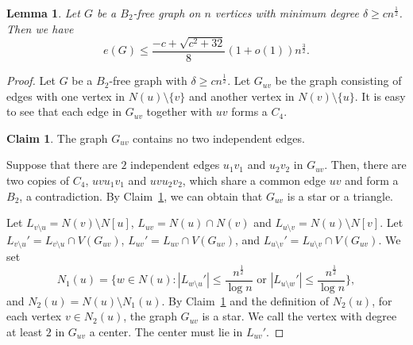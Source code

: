 \documentclass[11pt,a4paper]{article}
\newtheorem{lemma}{Lemma}[section]
\theoremstyle{definition}
\newtheorem{claimthm}{Claim}[section]
\newenvironment{claimproof}
  {\renewcommand{\qedsymbol}{\ensuremath{\blacksquare}}\proof}
  {\endproof}
  {\endproof}
\begin{document}
        \begin{lemma}\label{lem: with large min degree}
            Let $G$ be a $B_2$-free graph on $n$ vertices with minimum degree $\delta \geq c n^{\frac{1}{2}}$. Then we have
            \begin{equation*}
                e(G) \leq \frac{-c + \sqrt{c^2 + 32}}{8} (1 + o(1)) n^{\frac{3}{2}}. 
            \end{equation*}
        \end{lemma}
        \begin{proof}
            Let $G$ be a $B_2$-free graph with $\delta \geq c n^{\frac{1}{2}}$.
            Let $G_{uv}$ be the graph consisting of edges with one vertex in $N(u) \setminus \{v\}$ and another vertex in $N(v) \setminus \{u\}$.
            It is easy to see that each edge in $G_{uv}$ together with $uv$ forms a $C_4$.



            \begin{claimthm} \label{twoind}
             The graph $G_{uv}$ contains no two independent edges.
             \end{claimthm}
             
            \begin{claimproof}
                Suppose that there are $2$ independent edges $u_1 v_1$ and $u_2 v_2$ in $G_{uv}$.
                Then, there are two copies of $C_4$, $uv u_1 v_1$ and $uv u_2 v_2$, which share a common edge $uv$ and form a $B_2$, a contradiction.
            \end{claimproof}
            By Claim~\ref{twoind}, we can obtain that $G_{uv}$ is a star or a triangle.

            Let $L_{v \setminus u} = N(v) \setminus N[u]$, $L_{uv} = N(u) \cap N(v)$ and $L_{u \setminus v} = N(u) \setminus N[v]$.
            Let $L_{v \setminus u}' = L_{v \setminus u} \cap V(G_{uv})$, $L_{uv}' = L_{uv} \cap V(G_{uv})$, and $L_{u \setminus v}' = L_{u \setminus v} \cap V(G_{uv})$.
            We set 
            $$N_1 (u) = \{w \in N(u): |L_{w \setminus u}'| \leq \frac{n^{\frac{1}{2}}}{\log n} \text{ or } |L_{u \setminus w}'| \leq \frac{n^{\frac{1}{2}}}{\log n}\},$$ 
            and $N_2 (u) = N(u) \setminus N_1(u)$.
            By Claim~\ref{twoind} and the definition of $N_2(u)$, for each vertex $v \in N_2(u)$, the graph $G_{uv}$ is a star.
            We call the vertex with degree at least $2$ in $G_{uv}$ a center.
            The center must lie in $L_{uv}'$.


\end{proof}
\end{document}
